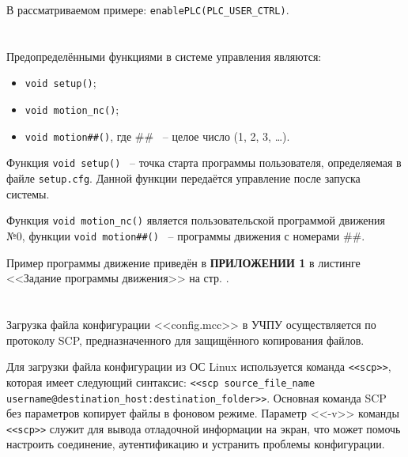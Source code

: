 В рассматриваемом примере: \texttt{enablePLC(PLC\_USER\_CTRL)}.

\section{}

Предопределёнными функциями в системе управления являются:
\begin{itemize}
\item \texttt{void setup()};  
\item \texttt{void motion\_nc()};
\item \texttt{void motion\#\#()}, где \#\# ~-- целое число (1, 2, 3, \dots). \killoverfullbefore \BL
\end{itemize}

Функция \texttt{void setup()} ~-- точка старта программы пользователя,  определяемая в файле \texttt{setup.cfg}. Данной функции передаётся управление после запуска системы. 


Функция \texttt{void motion\_nc()} является пользовательской программой движения №0, функции \texttt{void motion\#\#()} ~-- программы движения с номерами \#\#.

Пример программы движение приведён в \textbf{ПРИЛОЖЕНИИ 1} в листинге <<Задание программы движения>> на стр. \pageref{MotionNC}.

\section{}

Загрузка файла конфигурации <<config.mcc>> в УЧПУ осуществляется по протоколу SCP, предназначенного для защищённого копирования файлов.\killoverfullbefore \BL

Для загрузки файла конфигурации из ОС Linux используется команда \texttt{<<scp>>}, которая имеет следующий синтаксис: \texttt{<<scp source\_file\_name username@destination\_host:destination\_folder>>}. Основная команда SCP без параметров копирует файлы в фоновом режиме. Параметр <<-v>> команды \texttt{<<scp>>} служит для вывода отладочной информации на экран, что может помочь настроить соединение, аутентификацию и устранить проблемы конфигурации. \killoverfullbefore 

